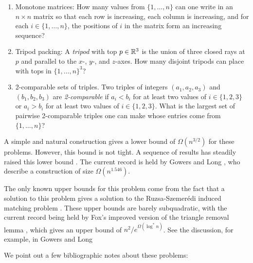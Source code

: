 \documentclass{patmorin}
\begin{document}
\begin{enumerate}
  \item Monotone matrices: How many values from $\{1,\ldots,n\}$ can
  one write in an $n\times n$ matrix so that each row is increasing,
  each column is increasing, and for each $i\in\{1,\ldots,n\}$, the
  positions of $i$ in the matrix form an increasing sequence?

  \item Tripod packing: A \emph{tripod} with top $p\in\mathbb{R}^3$ is the
  union of three closed rays at $p$ and parallel to the $x$-, $y$-,
  and $z$-axes.  How many disjoint tripods can place with tops in
  $\{1,\ldots,n\}^3$?

  \item 2-comparable sets of triples.  Two triples of integers
  $(a_1,a_2,a_3)$ and $(b_1,b_2,b_3)$ are \emph{2-comparable} if $a_i<
  b_i$ for at least two values of $i\in\{1,2,3\}$ or $a_i > b_i$ for
  at least two values of $i\in\{1,2,3\}$.  What is the largest set of
  pairwise 2-comparable triples one can make whose entries come from
  $\{1,\ldots,n\}$?
\end{enumerate}

A simple and natural construction gives a lower bound of
$\Omega(n^{3/2})$ for these problems.  However, this bound is
not tight. A sequence of results has steadily raised this lower bound
\cite{gowers.long:length,stein:combinatorial,stein:packing,stein.szabo:algebra,tiskin:packing}.
The current record is held by Gowers and Long \cite{gowers.long:length},
who describe a construction of size $\Omega(n^{1.546})$.

The only known upper bounds for this problem come from the fact that a
solution to this problem gives a solution to the Ruzsa-Szemer{\'e}di
induced matching problem \cite{ruzsa.szemeredi:triple}.  These upper
bounds are barely subquadratic, with the current record being held by
Fox's improved version of the triangle removal lemma \cite{fox:new},
which gives an upper bound of $n^{2}/e^{\Omega(\log^* n)}$.  See the
discussion, for example, in Gowers and Long \cite{gowers.long:length}

We point out a few bibliographic notes about these problems:
\end{document}
